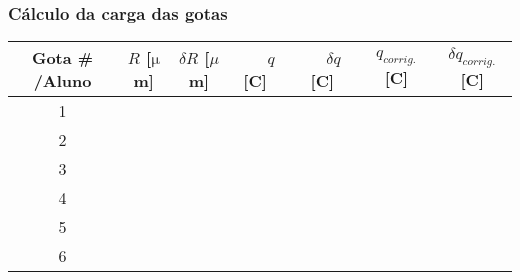 \documentclass[a4paper,12pt]{article}  %
\newcommand{\smu}{\mathrm{\mu}}
\begin{document}
\subsubsection{\sf Cálculo da carga das gotas}
\label{sec:calc}
\begin{center}
	\renewcommand{\arraystretch}{1.5}
	\begin{tabular}{|c|c|c|c|c|c|c|}
	\hline
	Gota \# /Aluno & $R$ [$\smu$m] & $\delta R$  [$\mu$m] & \,\,\,\,\,\,$q$ [C]\,\,\,\,\,\, & \,\,\,$\delta q$ [C] \,\,\,& $q_{corrig.}$ [C] & $\delta q_{corrig.}$ [C] \\ \hline
	 1  & &  &  & &  &  \\ \hline
	 2  & &  &  & &  & \\ \hline
	 3 & &  &  & &  & \\ \hline
	 4 & &  &  & &  & \\ \hline
	 5 & &  &  & &  & \\ \hline
	 6 & &  &  & &  & \\ \hline
 	\end{tabular}
\end{center}
\end{document}
